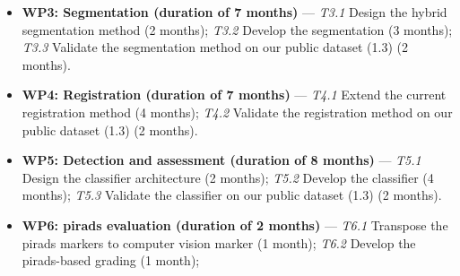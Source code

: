 \begin{itemize}[noitemsep]
\item[] \textbf{WP3: Segmentation (duration of 7 months)} ---
  \textit{T3.1} Design the hybrid segmentation method (2 months);
  \textit{T3.2} Develop the segmentation (3 months);
  \textit{T3.3} Validate the segmentation method on our public dataset (1.3) (2 months).
\item[] \textbf{WP4: Registration (duration of 7 months)} ---
  \textit{T4.1} Extend the current registration method (4 months);
  \textit{T4.2} Validate the registration method on our public dataset (1.3) (2 months).
\item[] \textbf{WP5: Detection and assessment (duration of 8 months)} ---
  \textit{T5.1} Design the classifier architecture (2 months);
  \textit{T5.2} Develop the classifier (4 months);
  \textit{T5.3} Validate the classifier on our public dataset (1.3) (2 months).
\item[] \textbf{WP6: \ac{pirads} evaluation (duration of 2 months)} ---
  \textit{T6.1} Transpose the \ac{pirads} markers to computer vision marker (1 month);
  \textit{T6.2} Develop the \ac{pirads}-based grading (1 month);

\end{itemize}
